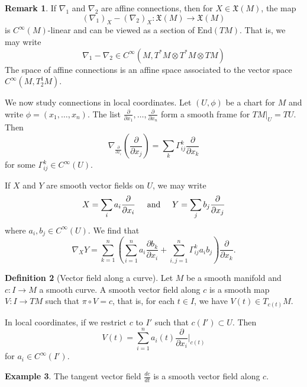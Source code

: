 \documentclass{amsart}
\numberwithin{equation}{section}
\theoremstyle{definition}
\newtheorem{definition}{Definition} [section]
\newtheorem{example}[definition]{Example}
\newtheorem{remark}[definition]{Remark}
\theoremstyle{theorem}
\begin{document}
\begin{remark}
If $\nabla_1$ and $\nabla_2$ are affine connections, then for $X \in \mathfrak{X}(M)$, the map 
\[
(\nabla_1)_X  -(\nabla_2)_X : \mathfrak{X}(M) \to \mathfrak{X}(M)
\]
is $C^\infty(M)$-linear and can be viewed as a section of $\text{End}(TM)$. That is, we may write 
\[
\nabla_1 - \nabla_2 \in C^\infty(M, T^*M \otimes T^*M \otimes TM)
\]
The space of affine connections is an affine space associated to the vector space $C^\infty(M, T_2^1M)$. 
\end{remark}

We now study connections in local coordinates. Let $(U,\phi)$ be a chart for $M$ and write $\phi = (x_1, \ldots, x_n)$. The list $\frac{\partial}{\partial x_1},
\ldots, \frac{\partial}{\partial x_n}$ form a smooth frame for $TM|_{U} = TU$. Then 
\[
\nabla_{\frac{\partial}{\partial x_i}}(\frac{\partial}{\partial x_j}) = \sum_{k} \Gamma_{ij}^k \frac{\partial}{\partial x_k}
\]
for some $\Gamma_{ij}^k \in C^\infty(U)$. 

If $X$ and $Y$ are smooth vector fields on $U$, we may write 
\[
X = \sum_{i} a_i \frac{\partial}{\partial x_i} \hspace{5mm} \text{and} \hspace{5mm} Y = \sum_{j} b_j \frac{\partial}{\partial x_j}
\]
where $a_i, b_j\in C^\infty(U)$.
We find that 
\[
\nabla_XY = \sum_{k=1}^n \left( \sum_{i=1}^n a_i \frac{\partial b_k}{\partial x_i} + \sum_{i,j=1}^n \Gamma_{ij}^k a_i b_j\right) \frac{\partial}{\partial x_k}.
\]


\begin{definition}[Vector field along a curve]
Let $M$ be a smooth manifold and $c : I \to M$ a smooth curve. A smooth vector field along $c$ is a smooth map $V :I \to TM$ such that $\pi \circ V = c$, that is, for each $t \in I$, we have $V(t) \in T_{c(t)}M$. 
\end{definition}

In local coordinates, if we restrict $c$ to $I'$ such that $c(I') \subset U$. Then  
\[
V(t) = \sum_{i=1}^n a_i(t) \frac{\partial}{\partial x_i}\Big|_{c(t)}
\]
for $a_i \in C^\infty(I')$. 

\begin{example}
The tangent vector field $\frac{dc}{dt}$ is a smooth vector field along $c$. 
\end{example}
\end{document}
